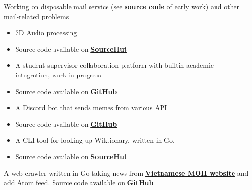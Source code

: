 
Working on disposable mail service (see \textbf{\href{https://github.com/Huy-Ngo/temp-mail} {source code}} of early work) and other mail-related problems


\begin{itemize}
\item 3D Audio processing
\item Source code available on \textbf{\href{https://sr.ht/~cnx/palace}{SourceHut}}
\end{itemize}

\divider

\begin{itemize}
\item A student-supervisor collaboration platform with builtin academic integration, work in progress
\item Source code available on \textbf{\href{https://github.com/Huy-Ngo/acanban}{GitHub}}
\end{itemize}

\divider

\begin{itemize}
\item A Discord bot that sends memes from various API
\item Source code available on \textbf{\href{https://github.com/Huy-Ngo/discord-meme-bot}{GitHub}}
\end{itemize}

\divider

\begin{itemize}
\item A CLI tool for looking up Wiktionary, written in Go.
\item Source code available on \textbf{\href{https://sr.ht/~huyngo/wikt-cli}{SourceHut}}
\end{itemize}

\divider

A web crawler written in Go taking news from  \textbf{\href{https://ncov.moh.gov.vn/dong-thoi-gian}{Vietnamese MOH website}} and add Atom feed. Source code available on \textbf{\href{https://github.com/Huy-Ngo/cov-news}{GitHub}}

